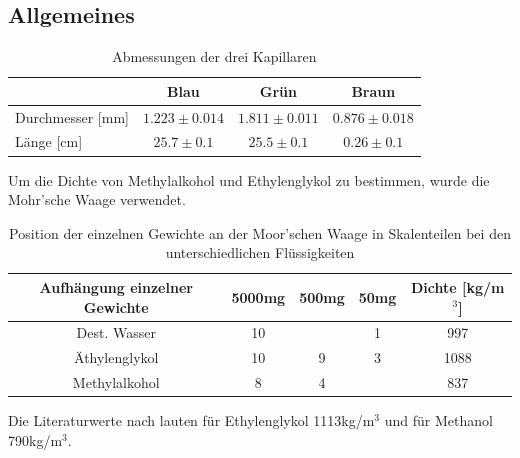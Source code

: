\documentclass[12pt,a4paper,titlepage,headinclude,bibtotoc]{scrartcl}
\begin{document}
\subsection{Allgemeines}
\begin{table}
\centering
\begin{tabular}{|l|c|c|c|}
\hline
 & Blau & Grün & Braun\\\hline
Durchmesser [mm]&$1.223\pm 0.014$&$1.811\pm 0.011$&$0.876\pm 0.018$\\\hline
Länge [cm]&$25.7\pm 0.1$&$ 25.5\pm 0.1$&$0.26\pm 0.1$\\\hline
\end{tabular}
\caption{Abmessungen der drei Kapillaren}
\end{table}
Um die Dichte von Methylalkohol und Ethylenglykol zu bestimmen, wurde die Mohr'sche Waage verwendet.
\begin{table}
\centering
\begin{tabular}{|c|c|c|c|c|}
\hline Aufhängung einzelner Gewichte & 5000mg & 500mg & 50mg &Dichte [kg/m$^3$]\\
\hline Dest. Wasser  & 10	&	& 1	& 997	\\
\hline Äthylenglykol & 10	& 9	& 3	& 1088	\\
\hline Methylalkohol & 8	& 4	& 	& 837	\\\hline
\end{tabular}
\caption{Position der einzelnen Gewichte an der Moor'schen Waage in Skalenteilen bei den unterschiedlichen Flüssigkeiten\label{tab:dichte}}
\end{table}
Die Literaturwerte nach \cite[S. 130-131]{Formelsammlung} lauten für Ethylenglykol 1113kg/m$^3$ und für Methanol 790kg/m$^3$.
\end{document}
